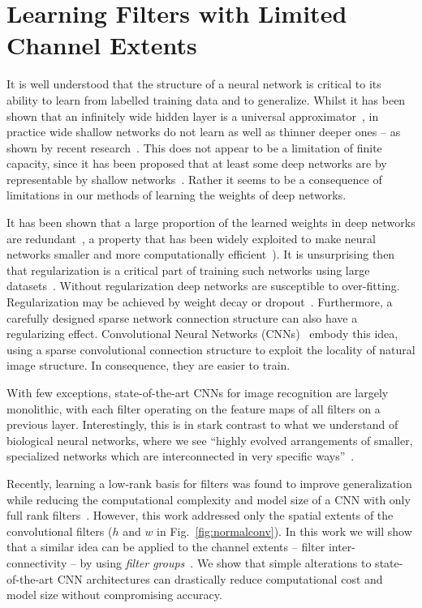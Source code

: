 \documentclass[thesis]{subfiles}
\begin{document}
	
	\chapter{Learning Filters with Limited Channel Extents}
	\label{deeproots}
	It is well understood that the structure of a neural network is critical to its ability to learn from labelled training data and to generalize. Whilst it has been shown that an infinitely wide hidden layer is a universal approximator~\citep{hornik89a}, in practice wide shallow networks do not learn as well as thinner deeper ones -- as shown by recent research~\citep{Krizhevsky2012imanet,Szegedy2014going,Simonyan2014verydeep,He2015}.
	This does not appear to be a limitation of finite capacity, since it has been proposed that at least some deep networks are by representable by shallow networks~\citep{Ba2013dothey}. Rather it seems to be a consequence of limitations in our methods of learning the weights of deep networks.
	
	It has been shown that a large proportion of the learned weights in deep networks are redundant~\citep{Denil2013predicting}, a property that has been widely exploited to make neural networks smaller and more computationally efficient~\citep{Szegedy2014going,Denton2014efficient}). It is unsurprising then that regularization is a critical part of training such networks using large datasets~\citep{Krizhevsky2012}. Without regularization deep networks are susceptible to over-fitting. Regularization may be achieved by weight decay or dropout~\cite{Hinton2012}. Furthermore, a carefully designed sparse network connection structure can also have a regularizing effect. Convolutional Neural Networks (CNNs)~\citep{Fuk80,Lecun1998} embody this idea, using a sparse convolutional connection structure to exploit the locality of natural image structure. In consequence, they are easier to train.
	
	With few exceptions, state-of-the-art CNNs for image recognition are largely monolithic, with each filter operating on the feature maps of all filters on a previous layer. Interestingly, this is in stark contrast to what we understand of biological neural networks, where we see ``highly evolved arrangements of smaller, specialized networks which are interconnected in very specific ways''~\citep{minsky1988perceptrons}.
	
	Recently, learning a low-rank basis for filters was found to improve generalization while reducing the computational complexity and model size of a CNN with only full rank filters~\citep{Ioannou2016}. However, this work addressed only the spatial extents of the convolutional filters (\ie $h$ and $w$ in Fig.~\ref{fig:normalconv}). In this work we will show that a similar idea can be applied to the channel extents -- \ie filter inter-connectivity -- by using \emph{filter groups}~\citep{Krizhevsky2012}. We show that simple alterations to state-of-the-art CNN architectures can drastically reduce computational cost and model size without compromising accuracy.
	
\end{document}
